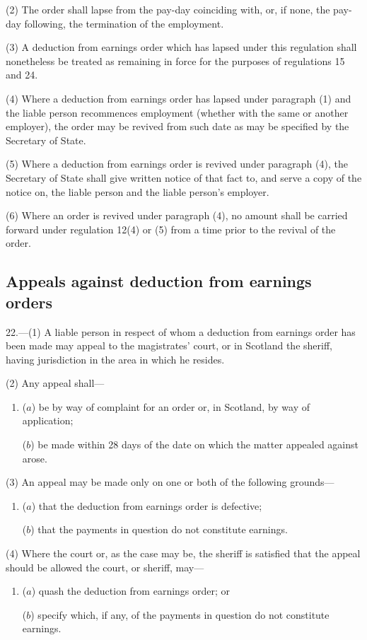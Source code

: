 \documentclass[12pt,a4paper]{article}
\begin{document}
(2) The order shall lapse from the pay-day coinciding with, or, if none, the pay-day following, the termination of the employment.

(3) A deduction from earnings order which has lapsed under this regulation shall nonetheless be treated as remaining in force for the purposes of regulations 15 and 24.

(4) Where a deduction from earnings order has lapsed under paragraph (1) and the liable person recommences employment (whether with the same or another employer), the order may be revived from such date as may be specified by the Secretary of State.

(5) Where a deduction from earnings order is revived under paragraph (4), the Secretary of State shall give written notice of that fact to, and serve a copy of the notice on, the liable person and the liable person’s employer.

(6) Where an order is revived under paragraph (4), no amount shall be carried forward under regulation 12(4) or (5) from a time prior to the revival of the order.

\subsection[22. Appeals against deduction from earnings orders]{Appeals against deduction from earnings orders}

22.—(1) A liable person in respect of whom a deduction from earnings order has been made may appeal to the magistrates' court, or in Scotland the sheriff, having jurisdiction in the area in which he resides.

(2) Any appeal shall—
\begin{enumerate}\item[]
($a$) be by way of complaint for an order or, in Scotland, by way of application;

($b$) be made within 28 days of the date on which the matter appealed against arose.
\end{enumerate}

(3) An appeal may be made only on one or both of the following grounds—
\begin{enumerate}\item[]
($a$) that the deduction from earnings order is defective;

($b$) that the payments in question do not constitute earnings.
\end{enumerate}

(4) Where the court or, as the case may be, the sheriff is satisfied that the appeal should be allowed the court, or sheriff, may—
\begin{enumerate}\item[]
($a$) quash the deduction from earnings order; or

($b$) specify which, if any, of the payments in question do not constitute earnings.
\end{enumerate}
\end{document}
